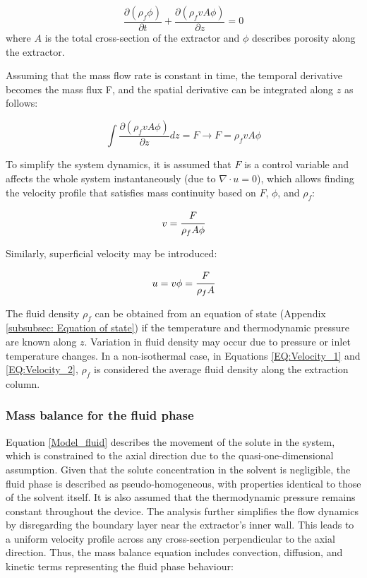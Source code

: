 \documentclass[a4paper,fleqn]{cas-dc}
\begin{document}
	{\footnotesize
		\begin{equation} \label{EQ: Continuity_differential}
			\frac{\partial (\rho_f \phi)}{\partial t} + \frac{\partial (\rho_f v A\phi)}{\partial z} = 0
		\end{equation}
	}
	where $A$ is the total cross-section of the extractor and $\phi$ describes porosity along the extractor.
	
	Assuming that the mass flow rate is constant in time, the temporal derivative becomes the mass flux F, and the spatial derivative can be integrated along $z$ as follows:
	
	{\footnotesize
		\begin{equation}
			\int \frac{\partial (\rho_f v A \phi )}{\partial z} dz = F \rightarrow F=\rho_f v A\phi
		\end{equation}
	}
	
	To simplify the system dynamics, it is assumed that $F$ is a control variable and affects the whole system instantaneously (due to $\nabla \cdot u = 0$), which allows finding the velocity profile that satisfies mass continuity based on $F$, $\phi$, and $\rho_f$:
	
	{\footnotesize
		\begin{equation} \label{EQ:Velocity_1}
			v = \cfrac{F}{\rho_f A\phi} 
		\end{equation}
	}
	
	Similarly, superficial velocity may be introduced:
	
	{\footnotesize
		\begin{equation} \label{EQ:Velocity_2}
			u = v \phi = \cfrac{F}{\rho_f A }
		\end{equation}
	}
	
	The fluid density $\rho_f$ can be obtained from an equation of state (Appendix \ref{subsubsec: Equation of state}) if the temperature and thermodynamic pressure are known along $z$. Variation in fluid density may occur due to pressure or inlet temperature changes. In a non-isothermal case, in Equations \ref{EQ:Velocity_1} and \ref{EQ:Velocity_2}, $\rho_f$ is considered the average fluid density along the extraction column.
	
	\subsubsection{Mass balance for the fluid phase} \label{CH: Mass_balance_fluid}
	
	Equation \ref{Model_fluid} describes the movement of the solute in the system, which is constrained to the axial direction due to the quasi-one-dimensional assumption. Given that the solute concentration in the solvent is negligible, the fluid phase is described as pseudo-homogeneous, with properties identical to those of the solvent itself. It is also assumed that the thermodynamic pressure remains constant throughout the device. The analysis further simplifies the flow dynamics by disregarding the boundary layer near the extractor's inner wall. This leads to a uniform velocity profile across any cross-section perpendicular to the axial direction. Thus, the mass balance equation includes convection, diffusion, and kinetic terms representing the fluid phase behaviour:
	
\end{document}

